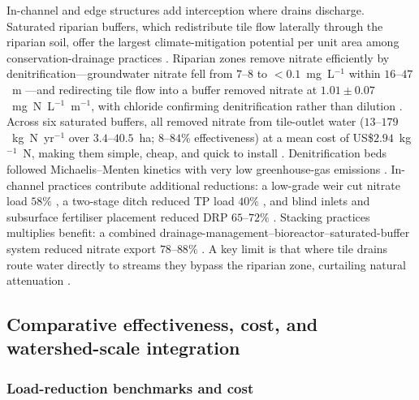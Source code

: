 In-channel and edge structures add interception where drains discharge.
Saturated riparian buffers, which redistribute tile flow laterally through
the riparian soil, offer the largest climate-mitigation potential per unit
area among conservation-drainage practices \parencite{Hall2025}. Riparian
zones remove nitrate efficiently by denitrification---groundwater nitrate fell
from $7$--$8$ to $<0.1$~mg~L$^{-1}$ within $16$--$47$~m
\parencite{JACOBS1985,Schilling2022}---and redirecting tile flow into a buffer
removed nitrate at $1.01\pm0.07$~mg~N~L$^{-1}$~m$^{-1}$, with chloride
confirming denitrification rather than dilution
\parencite{Jaynes2014,Carstensen2021}. Across six saturated buffers, all
removed nitrate from tile-outlet water ($13$--$179$~kg~N~yr$^{-1}$ over
$3.4$--$40.5$~ha; $8$--$84\%$ effectiveness) at a mean cost of
US\$$2.94$~kg$^{-1}$~N, making them simple, cheap, and quick to install
\parencite{Jaynes2019}. Denitrification beds followed Michaelis--Menten
kinetics with very low greenhouse-gas emissions \parencite{Ghane2015}.
In-channel practices contribute additional reductions: a low-grade weir cut
nitrate load $58\%$ \parencite{Strock2025b}, a two-stage ditch reduced TP load
$40\%$ \parencite{Hodaj2017}, and blind inlets and subsurface fertiliser
placement reduced DRP $65$--$72\%$
\parencite{Kröger2013,Wilson2019,Sharpley2019}. Stacking practices multiplies
benefit: a combined drainage-management--bioreactor--saturated-buffer system
reduced nitrate export $78$--$88\%$ \parencite{Singh2024b}. A key limit is
that where tile drains route water directly to streams they bypass the
riparian zone, curtailing natural attenuation \parencite{Puckett2005}.

\subsection{Comparative effectiveness, cost, and watershed-scale integration}

\subsubsection{Load-reduction benchmarks and cost}


